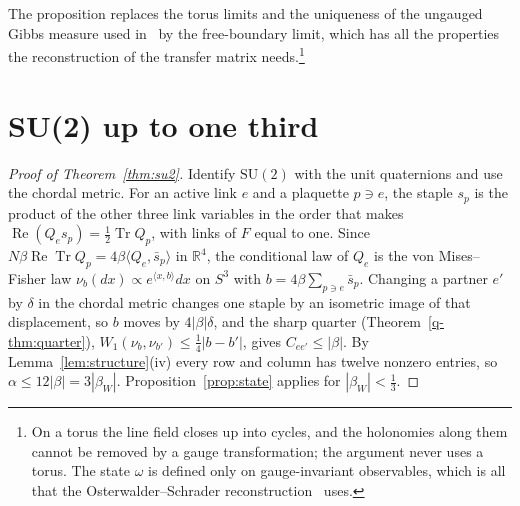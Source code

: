 \documentclass[aps,prd,twocolumn,superscriptaddress,nofootinbib,longbibliography,floatfix,amsmath,amssymb,10pt]{revtex4-2}
\theoremstyle{definition}
\theoremstyle{remark}
\newcommand{\R}{\mathbb{R}}
\newcommand{\SU}{\mathrm{SU}}
\newcommand{\Tr}{\operatorname{Tr}}
\newcommand{\ReTr}{\operatorname{Re}\operatorname{Tr}}
\newcommand{\ip}[2]{\langle #1,#2\rangle}
\begin{document}
The proposition replaces the torus limits and the uniqueness of the
ungauged Gibbs measure used in~\cite[Thm.~F]{BB26a} by the free-boundary
limit, which has all the properties the reconstruction of the transfer
matrix needs.\footnote{On a torus the line field closes up into cycles, and
the holonomies along them cannot be removed by a gauge transformation; the
argument never uses a torus. The state $\omega$ is defined only on
gauge-invariant observables, which is all that the Osterwalder--Schrader
reconstruction~\cite{OS73,OS75,OSei78} uses.}

\section{SU(2) up to one third}\label{sec:su2}

\begin{proof}[Proof of Theorem~\ref{thm:su2}]
Identify $\SU(2)$ with the unit quaternions and use the chordal metric. For an
active link $e$ and a plaquette $p\ni e$, the staple $s_p$ is the product of the
other three link variables in the order that makes $\operatorname{Re}(Q_es_p)
=\frac12\Tr Q_p$, with links of $F$ equal to one. Since $N\beta\ReTr Q_p=
4\beta\ip{Q_e}{\bar s_p}$ in $\R^4$, the conditional law of $Q_e$ is the von
Mises--Fisher law $\nu_b(dx)\propto e^{\ip xb}dx$ on $S^3$ with $b=4\beta
\sum_{p\ni e}\bar s_p$. Changing a partner $e'$ by $\delta$ in the chordal
metric changes one staple by an isometric image of that displacement, so $b$
moves by $4|\beta|\delta$, and the sharp quarter (Theorem~\ref{q-thm:quarter}),
$W_1(\nu_b,\nu_{b'})\le\frac14|b-b'|$, gives $C_{ee'}\le|\beta|$. By
Lemma~\ref{lem:structure}(iv) every row and column has twelve nonzero
entries, so $\alpha\le12|\beta|=3|\beta_W|$. Proposition~\ref{prop:state}
applies for $|\beta_W|<\frac13$.
\end{proof}
\end{document}
